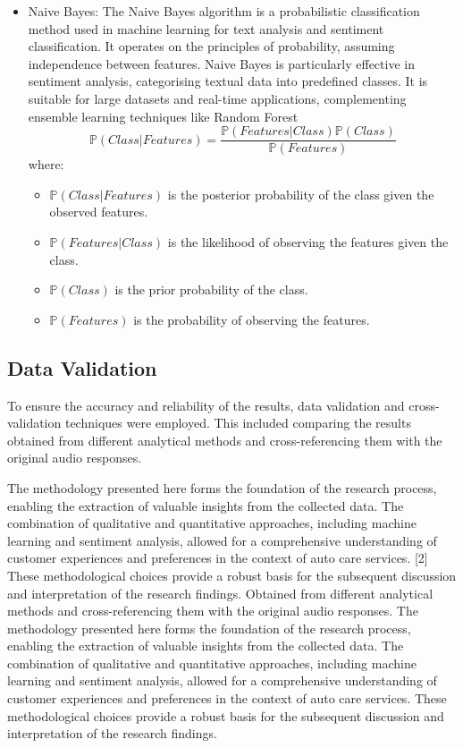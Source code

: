 \documentclass[conference]{IEEEtran}
\begin{document}
\begin{itemize}
\item Naive Bayes: The Naive Bayes algorithm is a probabilistic classification method used in machine learning for text analysis and sentiment classification. It operates on the principles of probability, assuming independence between features. Naive Bayes is particularly effective in sentiment analysis, categorising textual data into predefined classes. It is suitable for large datasets and real-time applications, complementing ensemble learning techniques like Random Forest 
\begin{equation}
    \mathbb{P}(Class|Features)= \frac{ \mathbb{P}(Features|Class)\mathbb{P}(Class)}{\mathbb{P}(Features)}
\end{equation}
where:
\begin{itemize}
    \item $\mathbb{P}(Class|Features)$ is the posterior probability of the class given the observed features.
    \item $\mathbb{P}(Features|Class)$ is the likelihood of observing the features given the class. 
    \item $\mathbb{P}(Class)$ is the prior probability of the class. 
    \item $\mathbb{P}(Features)$ is the probability of observing the features. 
\end{itemize}
\end{itemize}
\subsection{Data Validation} 
To ensure the accuracy and reliability of the results, data validation and cross-validation techniques were employed. This included comparing the results obtained from different analytical methods and cross-referencing them with the original audio responses. 

The methodology presented here forms the foundation of the research process, enabling the extraction of valuable insights from the collected data. The combination of qualitative and quantitative approaches, including machine learning and sentiment analysis, allowed for a comprehensive understanding of customer experiences and preferences in the context of auto care services. [2] These methodological choices provide a robust basis for the subsequent discussion and interpretation of the research findings.  Obtained from different analytical methods and cross-referencing them with the original audio responses. 
The methodology presented here forms the foundation of the research process, enabling the extraction of valuable insights from the collected data. The combination of qualitative and quantitative approaches, including machine learning and sentiment analysis, allowed for a comprehensive understanding of customer experiences and preferences in the context of auto care services.  These methodological choices provide a robust basis for the subsequent discussion and interpretation of the research findings.
\end{document}
